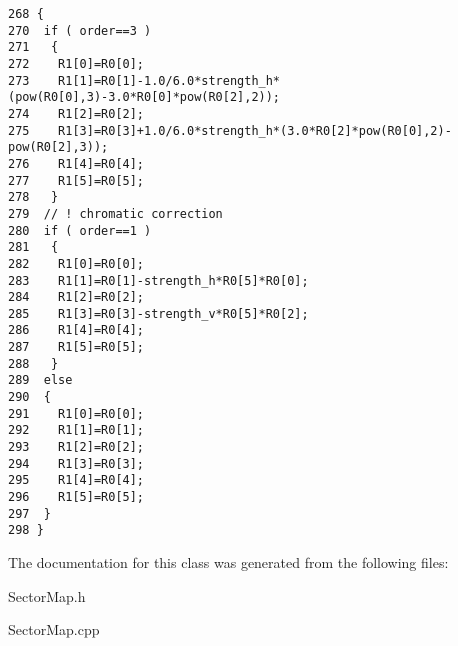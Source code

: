 \footnotesize\begin{verbatim}268 {
270  if ( order==3 ) 
271   {       
272    R1[0]=R0[0];
273    R1[1]=R0[1]-1.0/6.0*strength_h*(pow(R0[0],3)-3.0*R0[0]*pow(R0[2],2));
274    R1[2]=R0[2];
275    R1[3]=R0[3]+1.0/6.0*strength_h*(3.0*R0[2]*pow(R0[0],2)-pow(R0[2],3));
276    R1[4]=R0[4];
277    R1[5]=R0[5];
278   }
279  // ! chromatic correction  
280  if ( order==1 )
281   {      
282    R1[0]=R0[0];
283    R1[1]=R0[1]-strength_h*R0[5]*R0[0];
284    R1[2]=R0[2];
285    R1[3]=R0[3]-strength_v*R0[5]*R0[2];
286    R1[4]=R0[4];
287    R1[5]=R0[5];  
288   }      
289  else 
290  {
291    R1[0]=R0[0];
292    R1[1]=R0[1];
293    R1[2]=R0[2];
294    R1[3]=R0[3];
295    R1[4]=R0[4];
296    R1[5]=R0[5];          
297  }               
298 }
\end{verbatim}\normalsize 


The documentation for this class was generated from the following files:\begin{CompactItemize}
\item 
Sector\-Map.h\item 
Sector\-Map.cpp\end{CompactItemize}
